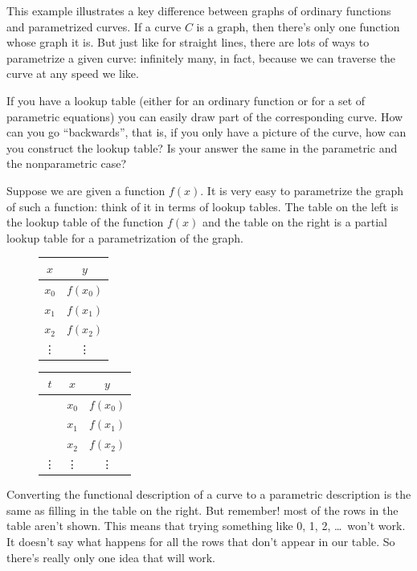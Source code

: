 \documentclass[11pt]{amsart}
\begin{document}
This example illustrates a key difference between graphs of ordinary functions and parametrized curves. If a curve $C$ is a graph, then there's only one function whose graph it is. But just like for straight lines, there are lots of ways to parametrize a given curve: infinitely many, in fact, because we can traverse the curve at any speed we like. 

\begin{discussionquestion}
	If you have a lookup table (either for an ordinary function or for a set of parametric equations) you can easily draw part of the corresponding curve. How can you go ``backwards'', that is, if you only have a picture of the curve, how can you construct the lookup table? Is your answer the same in the parametric and the nonparametric case?
\end{discussionquestion}

Suppose we are given a function $f(x)$. It is very easy to parametrize the graph of such a function: think of it in terms of lookup tables. The table on the left is the lookup table of the function $f(x)$ and the table on the right is a partial lookup table for a parametrization of the graph.
\begin{figure}[ht]
\begin{minipage}[b]{0.45\linewidth}
\centering
\begin{tabular}{c|c}
	$x$ & $y$ \\ \hline
	$x_0$ & $f(x_0)$ \\
	$x_1$ & $f(x_1)$ \\
	$x_2$ & $f(x_2)$ \\
	\vdots & \vdots
\end{tabular}
\end{minipage}
\hspace{0.5cm}
\begin{minipage}[b]{0.45\linewidth}
\centering
\begin{tabular}{c||c|c}
	$t$ & $x$  & $y$ \\ \hline
	  & $x_0$ & $f(x_0)$ \\
	  & $x_1$ & $f(x_1)$ \\
	  & $x_2$ & $f(x_2)$ \\
	\vdots & \vdots & \vdots
\end{tabular}
\end{minipage}
\end{figure}
Converting the functional description of a curve to a parametric description is the same as filling in the table on the right. But remember! most of the rows in the table aren't shown. This means that trying something like 0, 1, 2, \dots\ won't work. It doesn't say what happens for all the rows that don't appear in our table. So there's really only one idea that will work.
\end{document}
